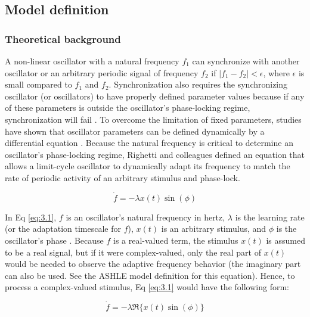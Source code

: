 \documentclass{report}
\begin{document}
\subsection{Model definition}

\subsubsection{Theoretical background}

A non-linear oscillator with a natural frequency $f_1$ can synchronize with another oscillator or an arbitrary periodic signal of frequency $f_2$ if $|f_1 - f_2| < \epsilon$, where $\epsilon$ is small compared to $f_1$ and $f_2$. Synchronization also requires the synchronizing oscillator (or oscillators) to have properly defined parameter values because if any of these parameters is outside the oscillator's phase-locking regime, synchronization will fail \cite{righetti2006dynamic}. To overcome the limitation of fixed parameters, studies have shown that oscillator parameters can be defined dynamically by a differential equation \cite{large1994resonance, large1999dynamics, acebron1998adaptive, borisyuk2001oscillatory, ermentrout1991adaptive, nakanishi2003learning, nishii1999learning, righetti2006dynamic}. Because the natural frequency is critical to determine an oscillator's phase-locking regime, Righetti and colleagues \cite{righetti2006dynamic} defined an equation that allows a limit-cycle oscillator to dynamically adapt its frequency to match the rate of periodic activity of an arbitrary stimulus and phase-lock.

\begin{equation}
\dot{f} = -\lambda x(t) \sin(\phi) \label{eq:3.1}
\end{equation}

In Eq \eqref{eq:3.1}, $f$ is an oscillator's natural frequency in hertz, $\lambda$ is the learning rate (or the adaptation timescale for $f$), $x(t)$ is an arbitrary stimulus, and $\phi$ is the oscillator's phase \cite{righetti2006dynamic}. Because $f$ is a real-valued term, the stimulus $x(t)$ is assumed to be a real signal, but if it were complex-valued, only the real part of $x(t)$ would be needed to observe the adaptive frequency behavior (the imaginary part can also be used. See the ASHLE model definition for this equation). Hence, to process a complex-valued stimulus, Eq \eqref{eq:3.1} would have the following form:

\begin{equation}
\dot{f} = -\lambda \Re \{ x(t) \sin(\phi) \} \label{eq:3.2}
\end{equation}
\end{document}

